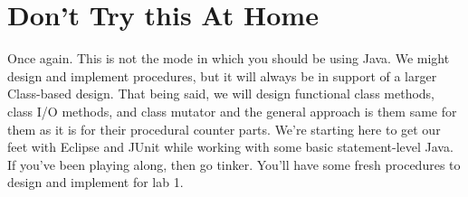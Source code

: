 \documentclass[]{tufte-handout}
\begin{document}
\section{Don't Try this At Home}

Once again. This is not the mode in which you should be using Java. We might design and implement procedures, but it will always be in support of a larger Class-based design. That being said, we will design functional class methods, class I/O methods, and class mutator and the general approach is them same for them as it is for their procedural counter parts. We're starting here to get our feet with Eclipse and JUnit while working with some basic statement-level Java. If you've been playing along, then go tinker. You'll have some fresh procedures to design and implement for lab 1. 
\end{document}

